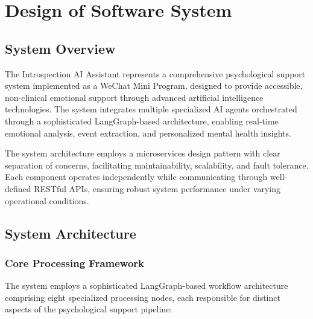 \section{Design of Software System}
\label{sec:design}

\subsection{System Overview}

The Introspection AI Assistant represents a comprehensive psychological support system implemented as a WeChat Mini Program, designed to provide accessible, non-clinical emotional support through advanced artificial intelligence technologies. The system integrates multiple specialized AI agents orchestrated through a sophisticated LangGraph-based architecture, enabling real-time emotional analysis, event extraction, and personalized mental health insights.

The system architecture employs a microservices design pattern with clear separation of concerns, facilitating maintainability, scalability, and fault tolerance. Each component operates independently while communicating through well-defined RESTful APIs, ensuring robust system performance under varying operational conditions.

\subsection{System Architecture}

\subsubsection{Core Processing Framework}

The system employs a sophisticated LangGraph-based workflow architecture comprising eight specialized processing nodes, each responsible for distinct aspects of the psychological support pipeline:

